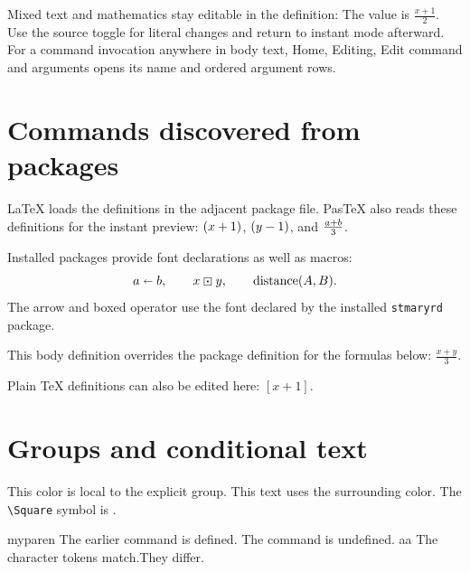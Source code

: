 \documentclass{article}
\begin{document}
\newcommand{\measure}[1]{The value is $\frac{#1}{2}$.}

Mixed text and mathematics stay editable in the definition: \measure{x+1}
Use the source toggle for literal changes and return to instant mode afterward.
For a command invocation anywhere in body text, Home, Editing, Edit command
and arguments opens its name and ordered argument rows.
\section{Commands discovered from packages}
\LaTeX{} loads the definitions in the adjacent package file.
PasTeX also reads these definitions for the instant preview:
$\left(x+1\right)$, $\left(y-1\right)$, and $\packagehalf{a+b}$.

Installed packages provide font declarations as well as macros:
\[
a\shortleftarrow b,\qquad x\boxdot y,\qquad \operatorname{distance}(A,B).
\]
The arrow and boxed operator use the font declared by the installed
\texttt{stmaryrd} package.

\renewcommand{\packagehalf}[1]{\frac{#1}{3}}
This body definition overrides the package definition for the formulas below:
$\packagehalf{x+y}$.

\def\bodyparen#1{\left[#1\right]}
Plain \TeX{} definitions can also be edited here: $\bodyparen{x+1}$.

\section{Groups and conditional text}
\begin{abstract}
An abstract is editable native text, including formulas such as $E=mc^2$.
\end{abstract}
\begingroup\color{exampleblue}This color is local to the explicit group.\endgroup
This text uses the surrounding color. The \verb|\Square| symbol is \Square.

\ifcsname myparen\endcsname
The earlier command is defined.
\else
The command is undefined.
\fi
\if aa The character tokens match.\else They differ.\fi
\end{document}
